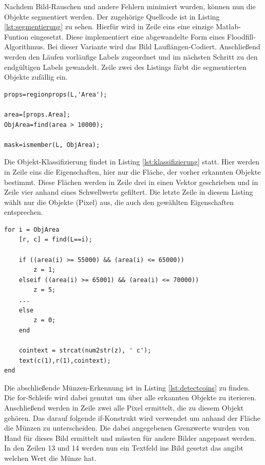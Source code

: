 \documentclass[a4paper,DIV=calc,ngerman]{scrartcl}
\begin{document}
Nachdem Bild-Rauschen und andere Fehlern minimiert wurden, können nun die Objekte segmentiert werden. Der zugehörige Quellcode ist in Listing \ref{lst:segmentierung} zu sehen. Hierfür wird in Zeile eins eine einzige Matlab-Funtion eingesetzt. Diese implementiert eine abgewandelte Form eines Floodfill-Algorithmus. Bei dieser Variante wird das Bild Lauflängen-Codiert.\cite{1} Anschließend werden den Läufen vorläufige Labels zugeordnet und im nächsten Schritt zu den endgültigen Labels gewandelt. Zeile zwei des Listings färbt die segmentierten Objekte zufällig ein.


\begin{lstlisting}[frame=single, float, caption={Objekt-Klassifizierung}, label={lst:klassifizierung}]
props=regionprops(L,'Area');

area=[props.Area];
ObjArea=find(area > 10000);

mask=ismember(L, ObjArea);
\end{lstlisting}
Die Objekt-Klassifizierung findet in Listing \ref{lst:klassifizierung} statt. Hier werden in Zeile eins die Eigenschaften, hier nur die Fläche, der vorher erkannten Objekte bestimmt. Diese Flächen werden in Zeile drei in einen Vektor geschrieben und in Zeile vier anhand eines Schwellwerts gefiltert. Die letzte Zeile in diesem Listing wählt nur die Objekte (Pixel) aus, die auch den gewählten Eigenschaften entsprechen. 

\begin{lstlisting}[frame=single, float, caption={Münzen-Erkennung}, label={lst:detectcoins}]
for i = ObjArea
    [r, c] = find(L==i);
    
    if ((area(i) >= 55000) && (area(i) <= 65000))
        z = 1;
    elseif ((area(i) >= 65001) && (area(i) <= 70000))
        z = 5;
    ...
    else
        z = 0;
    end

    cointext = strcat(num2str(z), ' c');
    text(c(1),r(1),cointext);
end
\end{lstlisting}

Die abschließende Münzen-Erkennung ist in Listing \ref{lst:detectcoins} zu finden. Die for-Schleife wird dabei genutzt um über alle erkannten Objekte zu iterieren. Anschließend werden in Zeile zwei alle Pixel ermittelt, die zu diesem Objekt gehören. Das darauf folgende if-Konstrukt wird verwendet um anhand der Fläche die Münzen zu unterscheiden. Die dabei angegebenen Grenzwerte wurden von Hand für dieses Bild ermittelt und müssten für andere Bilder angepasst werden. In den Zeilen 13 und 14 werden nun ein Textfeld ins Bild gesetzt das angibt welchen Wert die Münze hat.
\end{document}
